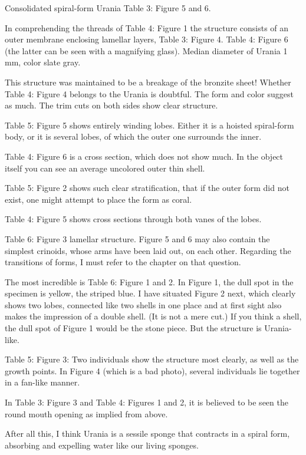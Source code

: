 \documentclass[a4paper, 11pt, oneside]{article}
\begin{document}
Consolidated spiral-form Urania Table 3: Figure 5 and 6.

In comprehending the threads of Table 4: Figure 1 the structure consists of an outer membrane enclosing lamellar layers, Table 3: Figure 4. Table 4: Figure 6 (the latter can be seen with a magnifying glass). Median diameter of Urania 1 mm, color slate gray.

This structure was maintained to be a breakage of the bronzite sheet! Whether Table 4: Figure 4 belongs to the Urania is doubtful. The form and color suggest as much. The trim cuts on both sides show clear structure.

Table 5: Figure 5 shows entirely winding lobes. Either it is a hoisted spiral-form body, or it is several lobes, of which the outer one surrounds the inner.

Table 4: Figure 6 is a cross section, which does not show much. In the object itself you can see an average uncolored outer thin shell.

Table 5: Figure 2 shows such clear stratification, that if the outer form did not exist, one might attempt to place the form as coral.

Table 4: Figure 5 shows cross sections through both vanes of the lobes.

Table 6: Figure 3 lamellar structure. Figure 5 and 6 may also contain the simplest crinoids, whose arms have been laid out, on each other. Regarding the transitions of forms, I must refer to the chapter on that question.

The most incredible is Table 6: Figure 1 and 2. In Figure 1, the dull spot in the specimen is yellow, the striped blue. I have situated Figure 2 next, which clearly shows two lobes, connected like two shells in one place and at first sight also makes the impression of a double shell. (It is not a mere cut.) If you think a shell, the dull spot of Figure 1 would be the stone piece. But the structure is Urania-like.

Table 5: Figure 3: Two individuals show the structure most clearly, as well as the growth points. In Figure 4 (which is a bad photo), several individuals lie together in a fan-like manner.

In Table 3: Figure 3 and Table 4: Figures 1 and 2, it is believed to be seen the round mouth opening as implied from above.

After all this, I think Urania is a sessile sponge that contracts in a spiral form, absorbing and expelling water like our living sponges.
\end{document}
